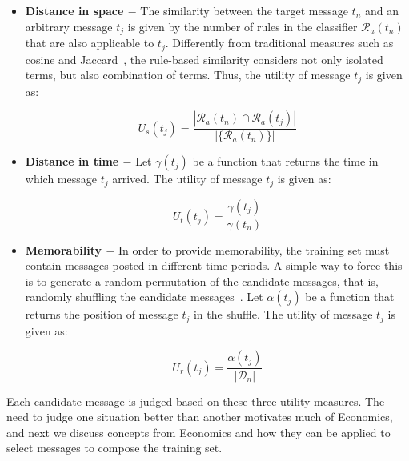 \documentclass{sig-alternate}
\begin{document}
\begin{itemize}
\item{\bf{Distance in space} $-$}
The similarity between the target message $t_n$ and an arbitrary message $t_j$ is given by the number of rules in the classifier $\mathcal{R}_a(t_n)$ that are also applicable to $t_j$.
Differently from traditional measures such as cosine and Jaccard~\cite{baeza99modern}, the rule-based similarity considers not only isolated terms, but also combination of terms.
Thus, the utility of message $t_j$ is given as:

\begin{equation}
U_s(t_j)=\displaystyle\frac{|\mathcal{R}_a(t_n)\cap\mathcal{R}_a(t_j)|}{|\{\mathcal{R}_a(t_n)\}|}
\end{equation}

\item{\bf{Distance in time} $-$}
Let $\gamma(t_j)$ be a function that returns the time in which message $t_j$ arrived. The utility of message $t_j$ is given as: 

\begin{equation}
U_t(t_j)=\displaystyle\frac{\gamma(t_j)}{\gamma(t_n)}
\end{equation}

\item{\bf{Memorability} $-$}
In order to provide memorability, the training set must contain messages posted in different time periods. A simple way to force this is to generate a random permutation of the candidate messages, that is, randomly shuffling the candidate messages~\cite{permutation}.
Let $\alpha(t_j)$ be a function that returns the position of message $t_j$ in the shuffle.
The utility of message $t_j$ is given as:

\begin{equation}
U_r(t_j)=\frac{\alpha(t_j)}{|\mathcal{D}_n|}
\end{equation}



\end{itemize}

Each candidate message is judged based on these three utility measures. The need to judge one situation better than another motivates much of Economics, and next we discuss concepts from Economics and how they can be applied to select messages to compose the training set.
\end{document}

